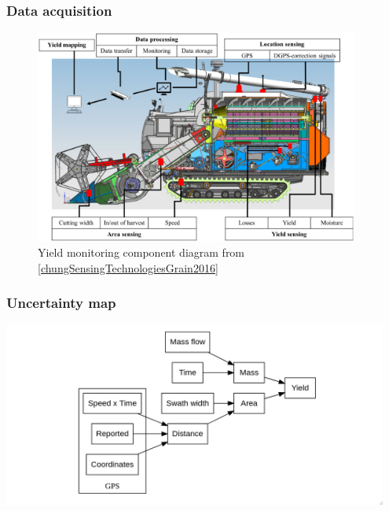 \documentclass{beamer}
\begin{document}
\begin{frame}
  \frametitle{Data acquisition}
  

  \begin{figure}
    \includegraphics[width=0.95\textwidth]{./figures/combine.png}
    \caption{Yield monitoring component diagram from \ref{chungSensingTechnologiesGrain2016}}
  \end{figure}
  
\end{frame}

\begin{frame}
  \frametitle{Uncertainty map}

  \includegraphics[width=0.95\textwidth]{./figures/uncertainty.png}
  
  
\end{frame}
\end{document}
